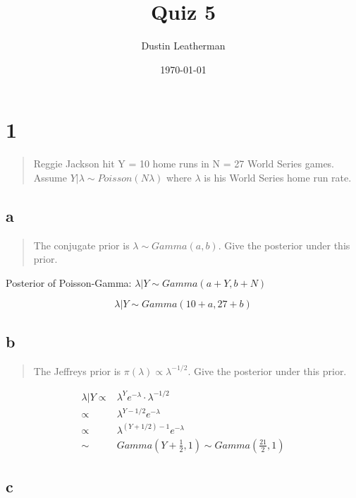 \documentclass[11pt]{article}
\author{Dustin Leatherman}
\date{\today}
\title{Quiz 5}
\begin{document}
\maketitle

\section{1}
\label{sec:org9c8bf6e}

\begin{quote}
Reggie Jackson hit Y = 10 home runs in N = 27 World Series games. Assume \(Y |
\lambda \sim Poisson(N \lambda)\) where \(\lambda\) is his World Series home run rate.
\end{quote}


\subsection{a}
\label{sec:org3077cb3}

\begin{quote}
The conjugate prior is \(\lambda \sim Gamma(a, b)\). Give the posterior under this prior.
\end{quote}

Posterior of Poisson-Gamma: \(\lambda | Y \sim Gamma(a + Y, b + N)\)

$$
\lambda | Y \sim Gamma(10 + a, 27 + b)
$$

\subsection{b}
\label{sec:orge9d4c29}

\begin{quote}
The Jeffreys prior is \(\pi (\lambda) \propto \lambda^{-1/2}\). Give the posterior
under this prior.
\end{quote}


\begin{equation}
\begin{split}
\lambda | Y \propto & \lambda^Y e^{- \lambda} \cdot \lambda^{-1/2}\\
\propto & \lambda^{Y - 1/2} e^{- \lambda}\\
\propto & \lambda^{(Y + 1/2) - 1} e^{- \lambda}\\
\sim & Gamma(Y + \frac{1}{2}, 1) \sim Gamma(\frac{21}{2}, 1)
\end{split}
\end{equation}

\subsection{c}
\label{sec:org5e34c89}
\end{document}

